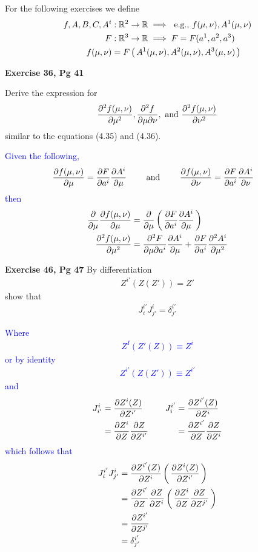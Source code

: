 \documentclass[12pt,a4paper]{report}
\newcommand{\BLUE}[1]{\textcolor{blue}{#1}}
\begin{document}
For the following exercises we define
\begin{align*}
	f, A, B, C, A^i &: \mathbb{R}^2 \to \mathbb{R} \implies \text{ e.g., } f(\mu,\nu), A^1(\mu,\nu) \\
	F &: \mathbb{R}^3 \to \mathbb{R} \implies F=F(a^1, a^2, a^3) \\
	f(\mu,\nu) &= F\left (\, A^1(\mu,\nu), A^2(\mu,\nu), A^3(\mu,\nu) \,\right )
\end{align*}
\begin{description}
	\item \textbf{Exercise 36, Pg 41}
	
	Derive the expression for 
	\begin{align*}
		\frac{\partial^2 f(\mu,\nu)}{\partial \mu^2}, \frac{\partial^2 f}{\partial\mu\partial\nu}, \text{ and } \frac{\partial^2 f(\mu,\nu)}{\partial \nu^2}
	\end{align*}similar to the equations (4.35) and (4.36).
	
	\BLUE{Given the following,\begin{align*}
		\frac{\partial f(\mu,\nu)}{\partial \mu} &= \frac{\partial F}{\partial a^i}\frac{\partial A^i}{\partial \mu} & \quad &\text{ and } & \quad 
		\frac{\partial f(\mu,\nu)}{\partial \nu} &= \frac{\partial F}{\partial a^i}\frac{\partial A^i}{\partial \nu} 
	\end{align*}then
	\begin{align*}
		\frac{\partial }{\partial \mu}\frac{\partial f(\mu,\nu)}{\partial \mu} &= \frac{\partial }{\partial \mu}\left (\, \frac{\partial F}{\partial a^i}\frac{\partial A^i}{\partial \mu} \,\right ) \\
		\frac{\partial^2 f(\mu,\nu)}{\partial \mu^2} &= \frac{\partial^2 F}{\partial \mu \partial a^i}\frac{\partial A^i}{\partial \mu}+\frac{\partial F}{\partial a^i}\frac{\partial^2 A^i}{\partial \mu^2} 
	\end{align*}
	}

	\item \textbf{Exercise 46, Pg 47}  By differentiation
	\begin{align*}
		Z^{i'}(Z(Z'))=Z'
	\end{align*}show that 
	\begin{align*}
		J_i^{i'}J_{j'}^i= \delta^{i'}_{j'}
	\end{align*}
	
	\BLUE{Where
	\begin{align*}
		Z^I(Z'(Z)) \equiv Z^i
	\end{align*}or by identity
	\begin{align*}
		Z^{i'}(Z(Z')) \equiv Z^{i'}
	\end{align*}and
	\begin{align*}
		J_{i'}^i &= \frac{\partial Z^i(Z)}{\partial Z^{i'}} & \quad
		J_i^{i'} &= \frac{\partial Z^{i'}(Z)}{\partial Z^i} \\
			&= \frac{\partial Z^i}{\partial Z}\frac{\partial Z}{\partial Z^{i'}} & \quad &= \frac{\partial Z^{i'}}{\partial Z}\frac{\partial Z}{\partial Z^i}
	\end{align*}which follows that
	\begin{align*}
		J_i^{i'}J_{j'}^i &= \frac{\partial Z^{i'}(Z)}{\partial Z^i}\left (\, \frac{\partial Z^i(Z)}{\partial Z^{i'}} \,\right ) \\
		&= \frac{\partial Z^{i'}}{\partial Z}\frac{\partial Z}{\partial Z^i}\left (\, \frac{\partial Z^i}{\partial Z}\frac{\partial Z}{\partial Z^{j'}} \,\right ) \\
		&= \frac{\partial Z^{i'}}{\partial Z^{j'}} \\
		&= \delta_{j'}^{i'}
	\end{align*}
	}
	

\end{description}
\end{document}
